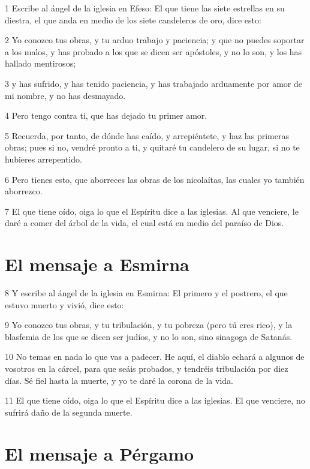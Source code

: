 \par 1 Escribe al ángel de la iglesia en Efeso: El que tiene las siete estrellas en su diestra, el que anda en medio de los siete candeleros de oro, dice esto:
\par 2 Yo conozco tus obras, y tu arduo trabajo y paciencia; y que no puedes soportar a los malos, y has probado a los que se dicen ser apóstoles, y no lo son, y los has hallado mentirosos;
\par 3 y has sufrido, y has tenido paciencia, y has trabajado arduamente por amor de mi nombre, y no has desmayado.
\par 4 Pero tengo contra ti, que has dejado tu primer amor.
\par 5 Recuerda, por tanto, de dónde has caído, y arrepiéntete, y haz las primeras obras; pues si no, vendré pronto a ti, y quitaré tu candelero de su lugar, si no te hubieres arrepentido.
\par 6 Pero tienes esto, que aborreces las obras de los nicolaítas, las cuales yo también aborrezco.
\par 7 El que tiene oído, oiga lo que el Espíritu dice a las iglesias. Al que venciere, le daré a comer del árbol de la vida, el cual está en medio del paraíso de Dios.

\section*{El mensaje a Esmirna}

\par 8 Y escribe al ángel de la iglesia en Esmirna: El primero y el postrero, el que estuvo muerto y vivió, dice esto:
\par 9 Yo conozco tus obras, y tu tribulación, y tu pobreza (pero tú eres rico), y la blasfemia de los que se dicen ser judíos, y no lo son, sino sinagoga de Satanás.
\par 10 No temas en nada lo que vas a padecer. He aquí, el diablo echará a algunos de vosotros en la cárcel, para que seáis probados, y tendréis tribulación por diez días. Sé fiel hasta la muerte, y yo te daré la corona de la vida.
\par 11 El que tiene oído, oiga lo que el Espíritu dice a las iglesias. El que venciere, no sufrirá daño de la segunda muerte.

\section*{El mensaje a Pérgamo}

